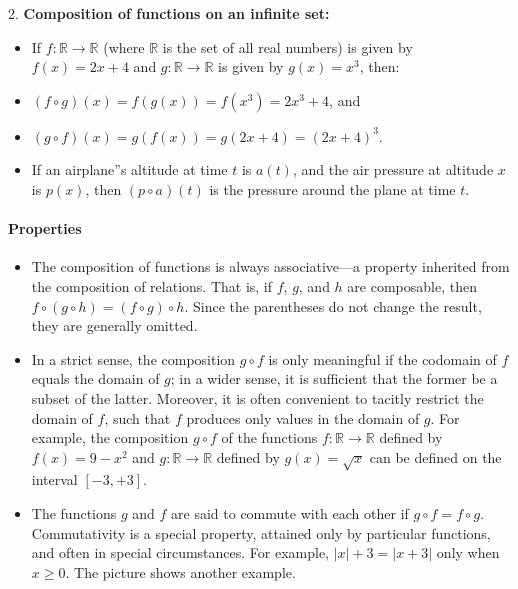 2. \textbf{Composition of functions on an infinite set:}
\begin{itemize}
    \item If $f : \mathbb{R} \to \mathbb{R}$ (where $\mathbb{R}$ is the set of all real numbers) is given by $f(x) = 2x + 4$ and $g : \mathbb{R} \to \mathbb{R}$ is given by $g(x) = x^3$, then:
    \item $(f \circ g)(x) = f(g(x)) = f(x^3) = 2x^3 + 4$, and
    \item $(g \circ f)(x) = g(f(x)) = g(2x + 4) = (2x + 4)^3$.
    \item If an airplane''s altitude at time $t$ is $a(t)$, and the air pressure at altitude $x$ is $p(x)$, then $(p \circ a)(t)$ is the pressure around the plane at time $t$.
\end{itemize}

\paragraph{Properties}

\begin{itemize}
    \item The composition of functions is always associative—a property inherited from the composition of relations. That is, if $f$, $g$, and $h$ are composable, then $f \circ (g \circ h) = (f \circ g) \circ h$. Since the parentheses do not change the result, they are generally omitted.
\end{itemize}

\begin{itemize}
    \item In a strict sense, the composition $g \circ f$ is only meaningful if the codomain of $f$ equals the domain of $g$; in a wider sense, it is sufficient that the former be a subset of the latter. Moreover, it is often convenient to tacitly restrict the domain of $f$, such that $f$ produces only values in the domain of $g$. For example, the composition $g \circ f$ of the functions $f : \mathbb{R} \to \mathbb{R}$ defined by $f(x) = 9 - x^2$ and $g : \mathbb{R} \to \mathbb{R}$ defined by $g(x) = \sqrt{x}$ can be defined on the interval $[-3, +3]$.
\end{itemize}

\begin{itemize}
    \item The functions $g$ and $f$ are said to commute with each other if $g \circ f = f \circ g$. Commutativity is a special property, attained only by particular functions, and often in special circumstances. For example, $|x| + 3 = |x + 3|$ only when $x \geq 0$. The picture shows another example.
\end{itemize}

